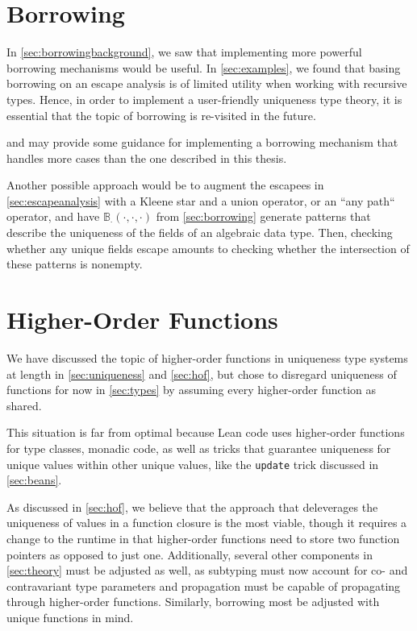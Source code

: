 \section{Borrowing}
In \cref{sec:borrowingbackground}, we saw that implementing more powerful borrowing mechanisms would be useful. In \cref{sec:examples}, we found that basing borrowing on an escape analysis is of limited utility when working with recursive types. Hence, in order to implement a user-friendly uniqueness type theory, it is essential that the topic of borrowing is re-visited in the future.

\cite{spiwack_linearly_2022} and \cite{weiss_oxide_2021} may provide some guidance for implementing a borrowing mechanism that handles more cases than the one described in this thesis.

Another possible approach would be to augment the escapees in \cref{sec:escapeanalysis} with a Kleene star and a union operator, or an ``any path`` operator, and have $\mathbb{B}_\cdot(\cdot, \cdot, \cdot)$ from \cref{sec:borrowing} generate patterns that describe the uniqueness of the fields of an algebraic data type. Then, checking whether any unique fields escape amounts to checking whether the intersection of these patterns is nonempty.

\section{Higher-Order Functions}
We have discussed the topic of higher-order functions in uniqueness type systems at length in \cref{sec:uniqueness} and \cref{sec:hof}, but chose to disregard uniqueness of functions for now in \cref{sec:types} by assuming every higher-order function as shared. 

This situation is far from optimal because Lean code uses higher-order functions for type classes, monadic code, as well as tricks that guarantee uniqueness for unique values within other unique values, like the \lstinline|update| trick discussed in \cref{sec:beans}. 

As discussed in \cref{sec:hof}, we believe that the approach that deleverages the uniqueness of values in a function closure is the most viable, though it requires a change to the runtime in that higher-order functions need to store two function pointers as opposed to just one. Additionally, several other components in \cref{sec:theory} must be adjusted as well, as subtyping must now account for co- and contravariant type parameters and propagation must be capable of propagating through higher-order functions. Similarly, borrowing most be adjusted with unique functions in mind.


